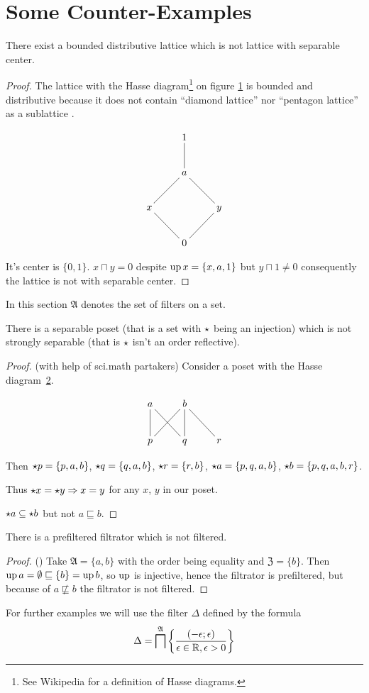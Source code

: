 \section{Some Counter-Examples}
\begin{example}
There exist a bounded distributive lattice which is not lattice with
separable center.\end{example}
\begin{proof}
The lattice with the Hasse diagram\footnote{See Wikipedia for a definition of Hasse diagrams.}
on figure \ref{not-sep-center} is bounded and distributive because
it does not contain ``diamond lattice'' nor ``pentagon lattice''
as a sublattice \cite{wiki:distributive-lattice}. 
\begin{figure}
\caption{\label{not-sep-center}}
\[
\xymatrix{ & 1\\
 & a\ar@{-}[u]\\
x\ar@{-}[ur] &  & y\ar@{-}[ul]\\
 & 0\ar@{-}[ul]\ar@{-}[ur]
}
\]
\end{figure}


It's center is $\{0,1\}$. $x\sqcap y=0$ despite $\operatorname{up} x=\{x,a,1\}$
but $y\sqcap1\ne 0$ consequently the lattice is not with separable
center.\end{proof}

In this section $\mathfrak{A}$ denotes the set of filters on a set.
\begin{example}
There is a separable poset (that is a set with $\star$ being
an injection) which is not strongly separable (that is $\star$ isn't an order reflective).\end{example}
\begin{proof}
(with help of sci.math partakers) Consider a poset with the Hasse
diagram~\ref{sep-counter}.

\begin{figure}[ht]
\caption{\label{sep-counter}}
\[
\xymatrix{a\ar@{-}[d]\ar@{-}[dr] & b\ar@{-}[dl]\ar@{-}[d]\ar@{-}[dr]\\
p & q & r
}
\]
\end{figure}


Then $\star p=\{p,a,b\}$, $\star q=\{q,a,b\}$, $\star r=\{r,b\}$,
$\star a=\{p,q,a,b\}$, $\star b=\{p,q,a,b,r\}$.

Thus $\star x=\star y\Rightarrow x=y$ for any $x$, $y$
in our poset.

$\star a\subseteq\star b$ but not $a\sqsubseteq b$.\end{proof}
\begin{example}
There is a prefiltered filtrator which is not filtered.\end{example}
\begin{proof}
() Take $\mathfrak{A}=\{a,b\}$ with the order
being equality and $\mathfrak{Z}=\{b\}$. Then $\operatorname{up} a=\emptyset\sqsubseteq\{b\}=\operatorname{up} b$,
so $\operatorname{up}$ is injective, hence the filtrator is prefiltered, but because
of $a\nsqsubseteq b$ the filtrator is not filtered.
\end{proof}
For further examples we will use the filter $\Delta$ defined by the
formula
\[
\Delta=\bigsqcap^{\mathfrak{A}}\left\{ \frac{(-\epsilon;\epsilon)}{\epsilon\in\mathbb{R},\epsilon>0}\right\}
\]


